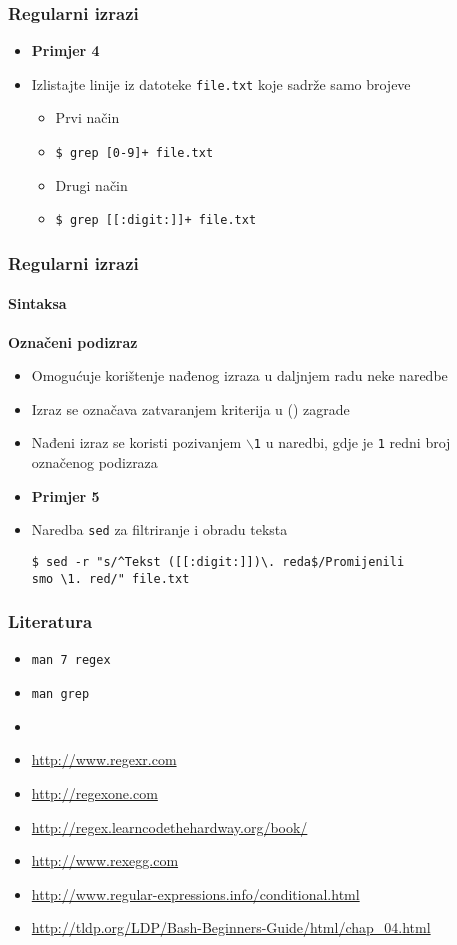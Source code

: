 \documentclass[table,usenames,dvipsnames]{beamer}
\newcommand{\shell}[1]{\texttt{#1}}
\begin{document}
\begin{frame}[t]
\frametitle{Regularni izrazi}
\begin{itemize}
\item \textbf{Primjer 4}
\item[] Izlistajte linije iz datoteke \shell{file.txt} koje sadrže samo brojeve
\begin{itemize}
	\item Prvi način
	\item[] \shell{\$ grep [0-9]+ file.txt}
	\item Drugi način
	\item[] \shell{\$ grep [[:digit:]]+ file.txt}
\end{itemize}
\end{itemize}
\end{frame}

\begin{frame}[fragile]
\frametitle{Regularni izrazi}
\framesubtitle{Sintaksa}
\textbf{Označeni podizraz}
\begin{itemize}
	\item Omogućuje korištenje nađenog izraza u daljnjem radu neke naredbe
	\item Izraz se označava zatvaranjem kriterija u () zagrade
	\item Nađeni izraz se koristi pozivanjem \shell{$\backslash$1} u naredbi, gdje je \shell{1} redni broj označenog podizraza
\end{itemize}
\vfill
\begin{itemize}
\item \textbf{Primjer 5}
\item[] Naredba \shell{sed} za filtriranje i obradu teksta
\small \begin{verbatim}$ sed -r "s/^Tekst ([[:digit:]])\. reda$/Promijenili 
smo \1. red/" file.txt\end{verbatim}
\end{itemize}
\vfill
\end{frame}


\begin{frame}[t]
\frametitle{Literatura}
\begin{itemize}
	\item[] \shell{man 7 regex}
	\item[] \shell{man grep}
	\item[]
  \item[] \small\url{http://www.regexr.com}
  \item[] \small\url{http://regexone.com}
  \item[] \small\url{http://regex.learncodethehardway.org/book/}
  \item[] \small\url{http://www.rexegg.com}
  \item[] \small\url{http://www.regular-expressions.info/conditional.html} 
  \item[] \small\url{http://tldp.org/LDP/Bash-Beginners-Guide/html/chap_04.html}
\end{itemize}
\end{frame}
\end{document}
